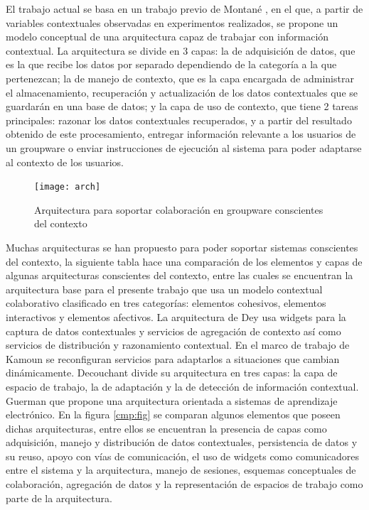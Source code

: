 El trabajo actual se basa en un trabajo previo de Montan\'e \cite{montane2013context}, en el que, a partir de variables contextuales observadas en experimentos realizados, se propone un modelo conceptual de una arquitectura capaz de trabajar con informaci\'on contextual. La arquitectura se divide en 3 capas: la de adquisici\'on de datos, que es la que recibe los datos por separado dependiendo de la categor\'ia a la que pertenezcan; la de manejo de contexto, que es la capa encargada de administrar el almacenamiento, recuperaci\'on y actualizaci\'on de los datos contextuales que se guardar\'an en una base de datos; y la capa de uso de contexto, que tiene 2 tareas principales: razonar los datos contextuales recuperados, y a partir del resultado obtenido de este procesamiento, entregar informaci\'on relevante a los usuarios de un groupware o enviar instrucciones de ejecuci\'on al sistema para poder adaptarse al contexto de los usuarios.

\begin{figure}[h!]
  \centering
  \texttt{[image: arch]}
  \caption{Arquitectura para soportar colaboraci\'on en groupware conscientes del contexto \cite{montane2013context}}
\end{figure}

Muchas arquitecturas se han propuesto para poder soportar sistemas conscientes del contexto, la siguiente tabla hace una comparaci\'on de los elementos y capas de algunas arquitecturas conscientes del contexto, entre las cuales se encuentran la arquitectura base para el presente trabajo que usa un modelo contextual colaborativo clasificado en tres categor\'ias: elementos cohesivos, elementos interactivos y elementos afectivos. La arquitectura de Dey\cite{dey1999architecture}  usa widgets para la captura de datos contextuales y servicios de agregaci\'on de contexto as\'i como servicios de distribuci\'on y razonamiento contextual. En el marco de trabajo de Kamoun \cite{kamoun2012fadyrcos}  se reconfiguran servicios para adaptarlos a situaciones que cambian din\'amicamente. Decouchant \cite{decouchant2013adapting} divide su arquitectura en tres capas: la capa de espacio de trabajo, la de adaptaci\'on y la de detecci\'on de informaci\'on contextual. Guerman  \cite{guermah2013ontology} que propone una arquitectura orientada a sistemas de aprendizaje electr\'onico. En la figura \ref{cmp:fig} se comparan algunos elementos que poseen dichas arquitecturas, entre ellos se encuentran la presencia de capas como adquisici\'on, manejo y distribuci\'on de datos contextuales, persistencia de datos y su reuso, apoyo con v\'ias de comunicaci\'on, el uso de widgets como comunicadores entre el sistema y la arquitectura, manejo de sesiones, esquemas conceptuales de colaboraci\'on, agregaci\'on de datos y la representaci\'on de espacios de trabajo como parte de la arquitectura.

